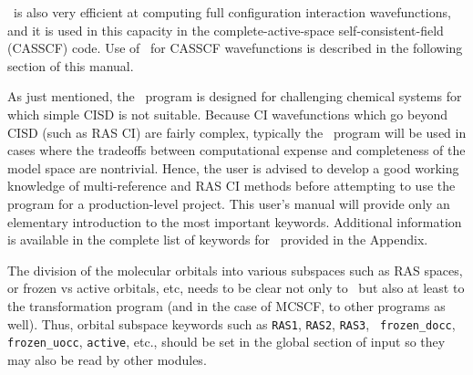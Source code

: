 \PSIdetci\ is also very efficient at computing full configuration interaction
wavefunctions, and it is used in this capacity in the complete-active-space
self-consistent-field (CASSCF) code.  Use of \PSIdetci\ for CASSCF
wavefunctions is described in the following section of this manual.

As just mentioned, the \PSIfour\ program is designed for challenging 
chemical systems for which simple CISD is not suitable.  Because
CI wavefunctions which go beyond CISD (such as RAS CI) are fairly complex,
typically the \PSIdetci\ program will be used in cases where the 
tradeoffs between computational expense and completeness of the 
model space are nontrivial.  Hence, the user is advised to develop
a good working knowledge of multi-reference and RAS CI methods before
attempting to use the program for a production-level project.  This user's
manual will provide only an elementary introduction to the most
important keywords.  Additional information is available in the complete
list of keywords for \PSIdetci\ provided in the Appendix.

The division of the molecular orbitals into various subspaces such as
RAS spaces, or frozen vs active orbitals, etc, needs to be clear not
only to \PSIdetci\, but also at least to the transformation program
(and in the case of MCSCF, to other programs as well).  Thus, orbital
subspace keywords such as {\tt RAS1}, {\tt RAS2}, {\tt RAS3}, {\tt
frozen\_docc}, {\tt frozen\_uocc}, {\tt active}, etc., should be set
in the global section of input so they may also be read by other modules.

